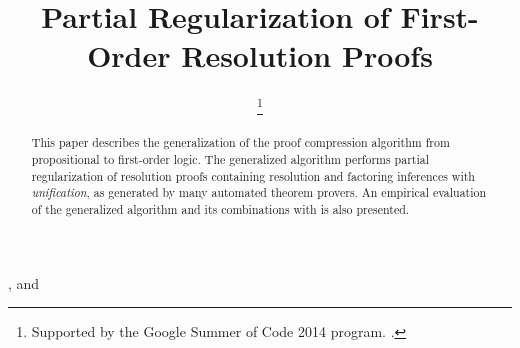 \documentclass{iosart2x}
\theoremstyle{definition}
\begin{document}
\begin{frontmatter} 
\title{Partial Regularization of First-Order Resolution Proofs}


\author[A]{ %
\thanks{Supported by the Google Summer of Code 2014 program. .}%
}, and 
\author[B]{ }

\address[A]{School of Computer Science, , 200 University Ave. W., Waterloo, ON N2L 3G1, }
\address[B]{College of Engineering and Computer Science, ,
Canberra ACT 0200, \\
,
Karlsplatz 13, 1040, Vienna, 
}

\begin{abstract}
This paper describes the generalization of the 
proof compression algorithm
\RecyclePivotsIntersection 
from propositional to first-order logic. The generalized algorithm performs partial regularization of resolution proofs containing resolution and factoring inferences with \emph{unification}, as generated by many automated theorem provers. An empirical evaluation of the generalized algorithm and its combinations with \SFOLowerUnits is also presented.
\end{abstract}

\begin{keyword}
\end{keyword}



\end{frontmatter}
\end{document}
